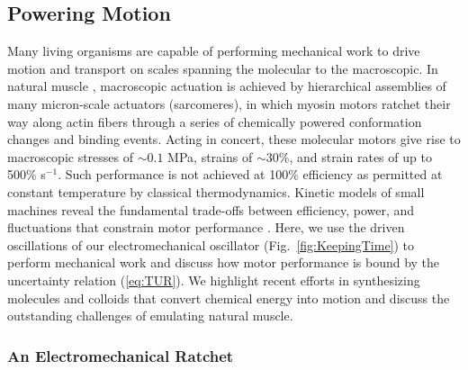 \begin{appendices}
\subsection{Powering Motion}

Many living organisms are capable of performing mechanical work to drive motion and transport on scales spanning the molecular to the macroscopic. In natural muscle \cite{Alberts2015}, macroscopic actuation is achieved by hierarchical assemblies of many micron-scale actuators (sarcomeres), in which myosin motors ratchet their way along actin fibers through a series of chemically powered conformation changes and binding events. Acting in concert, these molecular motors give rise to macroscopic stresses of ${\sim}0.1$ MPa, strains of ${\sim}30$\%, and strain rates of up to 500\% s$^{-1}$.  Such performance is not achieved at 100\% efficiency as permitted at constant temperature by classical thermodynamics.  Kinetic models of small machines reveal the fundamental trade-offs between efficiency, power, and fluctuations that constrain motor performance \cite{Pietzonka2016}. Here, we use the driven oscillations of our electromechanical oscillator (Fig.~\ref{fig:KeepingTime}) to perform mechanical work and discuss how motor performance is bound by the uncertainty relation (\ref{eq:TUR}).  We highlight recent efforts in synthesizing molecules and colloids that convert chemical energy into motion and discuss the outstanding challenges of emulating natural muscle.

\subsubsection{An Electromechanical Ratchet}


\end{appendices}
